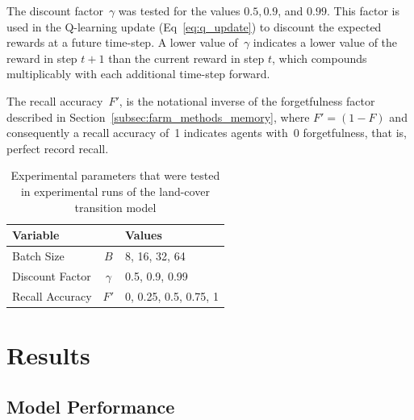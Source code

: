 The discount factor~$\gamma$ was tested for the values $0.5, 0.9$,
and $0.99$.
This factor is used in the Q-learning update (Eq~\ref{eq:q_update})
to discount the expected rewards at a future time-step.
A lower value of~$\gamma$ indicates a lower value of the
reward in step $t+1$ than the current reward in step $t$,
which compounds multiplicably with each additional time-step forward.

The recall accuracy~$F'$, is the notational inverse of the
forgetfulness factor described in Section~\ref{subsec:farm_methods_memory},
where $F'=(1-F)$ and consequently a recall accuracy of~1 indicates agents
with~0 forgetfulness, that is, perfect record recall.

\begin{table}
\caption{Experimental parameters that were tested in experimental runs
of the land-cover transition model}
\label{tab:land_exp}
\centering
\begin{tabular}{lcl}
\hline
\hline
    Variable && Values \\
    \hline
    Batch Size & $B$ & 8, 16, 32, 64 \\
    Discount Factor & $\gamma$ & 0.5, 0.9, 0.99 \\
    Recall Accuracy & $F'$ & 0, 0.25, 0.5, 0.75, 1 \\
    \hline
\end{tabular}
\end{table}

% 
% 
% 


\section{Results}
\label{sec:land_results}

\subsection{Model Performance}
\label{subsec:land_results_performance}

